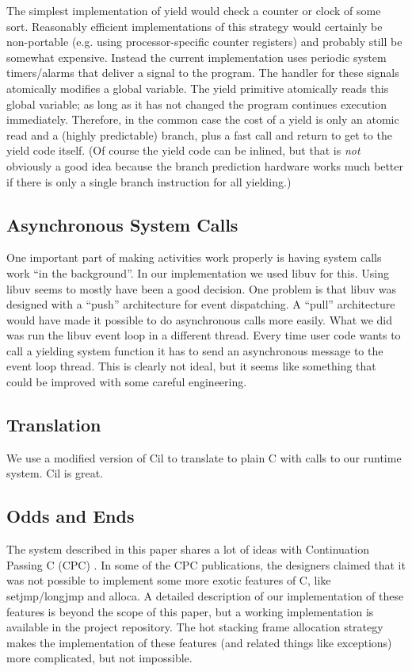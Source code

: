 \documentclass[10pt,preprint]{sigplanconf}
\begin{document}
The simplest implementation of yield would check a counter or clock of some sort.
Reasonably efficient implementations of this strategy would certainly be non-portable (e.g. using processor-specific counter registers) and probably still be somewhat expensive.
Instead the current \charcoal implementation uses periodic system timers/alarms that deliver a signal to the program.
The handler for these signals atomically modifies a global variable.
The yield primitive atomically reads this global variable; as long as it has not changed the program continues execution immediately.
Therefore, in the common case the cost of a yield is only an atomic read and a (highly predictable) branch, plus a fast call and return to get to the yield code itself.
(Of course the yield code can be inlined, but that is \emph{not} obviously a good idea because the branch prediction hardware works much better if there is only a single branch instruction for all yielding.)

\subsection{Asynchronous System Calls}

One important part of making activities work properly is having system calls work ``in the background''.
In our implementation we used libuv for this.
Using libuv seems to mostly have been a good decision.
One problem is that libuv was designed with a ``push'' architecture for event dispatching.
A ``pull'' architecture would have made it possible to do asynchronous calls more easily.
What we did was run the libuv event loop in a different thread.
Every time user code wants to call a yielding system function it has to send an asynchronous message to the event loop thread.
This is clearly not ideal, but it seems like something that could be improved with some careful engineering.

\subsection{Translation}

We use a modified version of Cil \cite{Necula2002} to translate \charcoal{} to plain C with calls to our runtime system.
Cil is great.

\subsection{Odds and Ends}

The system described in this paper shares a lot of ideas with Continuation Passing C (CPC) \cite{Kerneis2013}.
In some of the CPC publications, the designers claimed that it was not possible to implement some more exotic features of C, like setjmp/longjmp and alloca.
A detailed description of our implementation of these features is beyond the scope of this paper, but a working implementation is available in the project repository.
The hot stacking frame allocation strategy makes the implementation of these features (and related things like exceptions) more complicated, but not impossible.
\end{document}
